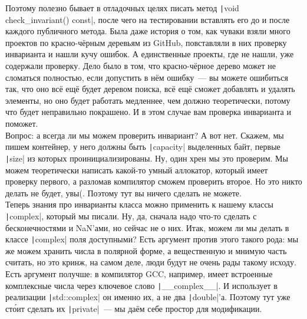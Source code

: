 \documentclass{article}
\begin{document}
    Поэтому полезно бывает в отладочных целях писать метод \texttt|void check_invariant() const|, после чего на тестировании вставлять его до и после каждого публичного метода. Была даже история о том, как чуваки взяли много проектов по красно-чёрным деревьям из GitHub, повставляли в них проверку инварианта и нашли кучу ошибок. А единственные проекты, где не нашли, уже содержали проверку. Дело было в том, что красно-чёрное дерево может не сломаться полностью, если допустить в нём ошибку~--- вы можете ошибиться так, что оно всё ещё будет деревом поиска, всё ещё сможет добавлять и удалять элементы, но оно будет работать медленнее, чем должно теоретически, потому что будет неправильно покрашено. И в этом случае вам проверка инварианта и поможет.\\
    Вопрос: а всегда ли мы можем проверить инвариант? А вот нет. Скажем, мы пишем контейнер, у него должны быть \texttt|capacity| выделенных байт, первые \texttt|size| из которых проинициализированы. Ну, один хрен мы это проверим. Мы можем теоретически написать какой-то умный аллокатор, который имеет проверку первого, а разломав компилятор сможем проверить второе. Но это никто делать не будет, увы(. Поэтому тут вы ничего сделать не можете.\\
    Теперь знания про инварианты класса можно применить к нашему классы \texttt|complex|, который мы писали. Ну, да, сначала надо что-то сделать с бесконечностями и NaN'ами, но сейчас не о них. Итак, можем ли мы делать в классе \texttt|complex| поля доступными? Есть аргумент против этого такого рода: мы же можем хранить числа в полярной форме, а вещественную и мнимую часть считать, но это кринж, на самом деле, люди будут не очень рады такому исходу. Есть аргумент получше: в компилятор GCC, например, имеет встроенные комплексные числа через ключевое слово \texttt|__complex__|. И использует в реализации \texttt|std::complex| он именно их, а не два \texttt|double|'а. Поэтому тут уже ст\'{о}ит сделать их \texttt|private|~--- мы даём себе простор для модификации.
\end{document}
